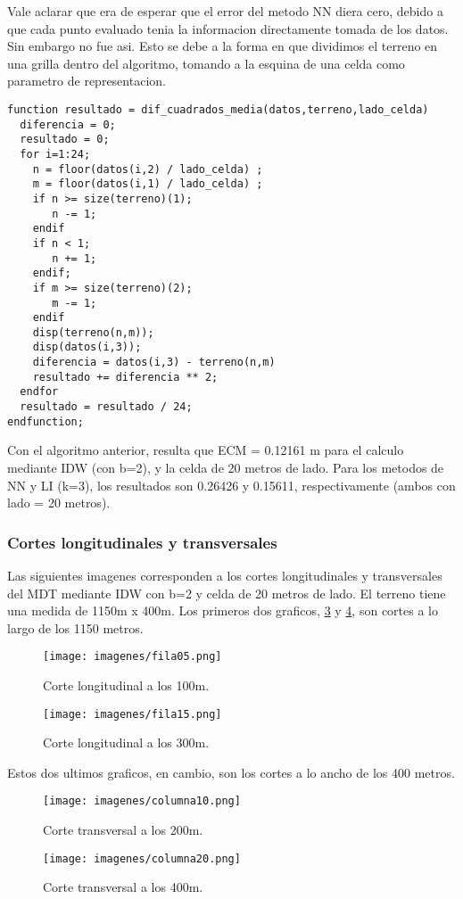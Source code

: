 \documentclass{article}
\begin{document}
Vale aclarar que era de esperar que el error del metodo NN diera cero,
debido a que cada punto evaluado tenia la informacion directamente
tomada de los datos. Sin embargo no fue asi. Esto se debe a la forma
en que dividimos el terreno en una grilla dentro del algoritmo,
tomando a la esquina de una celda como parametro de representacion.
\begin{verbatim}
function resultado = dif_cuadrados_media(datos,terreno,lado_celda)
  diferencia = 0;
  resultado = 0;
  for i=1:24;
    n = floor(datos(i,2) / lado_celda) ;
    m = floor(datos(i,1) / lado_celda) ;
    if n >= size(terreno)(1);
       n -= 1;
    endif
    if n < 1;
       n += 1;
    endif;
    if m >= size(terreno)(2);
       m -= 1;
    endif
    disp(terreno(n,m));
    disp(datos(i,3));
    diferencia = datos(i,3) - terreno(n,m)
    resultado += diferencia ** 2;
  endfor
  resultado = resultado / 24;
endfunction;
\end{verbatim}
Con el algoritmo anterior, resulta que ECM = 0.12161 m para el calculo
mediante IDW (con b=2), y la celda de 20 metros de lado. Para los
metodos de NN y LI (k=3), los resultados son 0.26426 y 0.15611,
respectivamente (ambos con lado = 20 metros).

\subsubsection{Cortes longitudinales y transversales}
Las siguientes imagenes corresponden a los cortes longitudinales y
transversales del MDT mediante IDW con b=2 y celda de 20 metros de
lado.
El terreno tiene una medida de 1150m x 400m. Los primeros dos
graficos, \ref{fig:trans200} y \ref{fig:trans400}, son cortes a lo
largo de los 1150 metros. 
\begin{figure}[H]
  \centering
  \texttt{[image: imagenes/fila05.png]}
  \caption{Corte longitudinal a los 100m.}
  \label{fig:long100}
\end{figure}
\begin{figure}[H]
  \centering
  \texttt{[image: imagenes/fila15.png]}
  \caption{Corte longitudinal a los 300m.}
  \label{fig:long300}
\end{figure}

Estos dos ultimos graficos, en cambio, son los cortes a lo ancho de
los 400 metros.
\begin{figure}[H]
  \centering
  \texttt{[image: imagenes/columna10.png]}
  \caption{Corte transversal a los 200m.}
  \label{fig:trans200}
\end{figure}
\begin{figure}[H]
  \centering
  \texttt{[image: imagenes/columna20.png]}
  \caption{Corte transversal a los 400m.}
  \label{fig:trans400}
\end{figure}
\end{document}
